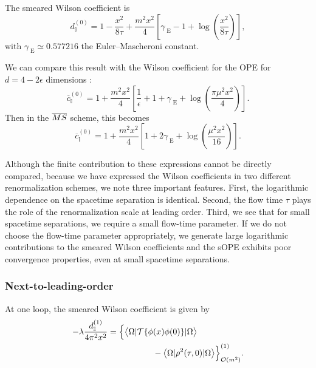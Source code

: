 The smeared Wilson 
coefficient is
\begin{equation}\label{eq:d1lead}
d_{\mathbb{I}}^{(0)} = 1 -
\frac{x^2}{8\tau}  +\frac{m^2x^2}{4}\left[\gamma_{\;\mathrm{E}} -1 + 
\log\left(\frac{x^2}{8\tau}\right)\right],
\end{equation}
with $\gamma_{\;\mathrm{E}}\simeq 0.577216$ the Euler--Mascheroni constant.

We can compare this result with the Wilson coefficient 
for the OPE for $d = 4-2\epsilon$ 
dimensions \cite{Collins:1984rdg}:
\begin{equation}
\overline{c}_{\mathbb{I}}^{(0)} =  
1 + \frac{  
m^2x^2}{4} \left[\frac{1}{\epsilon} + 1 +\gamma_{\;\mathrm{E}} + 
\log\left(\frac{\pi\mu^2x^2}{4}\right)\right].
\end{equation}
Then in the $\overline{MS}$ scheme, this becomes
\begin{equation}
\overline{c}_{\mathbb{I}}^{(0)} =  
1 +\frac{  
m^2x^2}{4} \left[1 +  2\gamma_{\;\mathrm{E}} + 
\log\left(\frac{\mu^2x^2}{16}\right)\right].
\end{equation}

Although the finite contribution to these expressions cannot be directly 
compared, 
because we have expressed the Wilson coefficients in two different 
renormalization schemes, we note three important features. First, the 
logarithmic dependence on the spacetime separation is identical. Second, 
the flow time $\tau$ plays the role of the renormalization scale at leading 
order. Third, we see that for small spacetime 
separations, we require a small flow-time parameter. If we do 
not choose the flow-time parameter appropriately, we generate large logarithmic 
contributions to the smeared Wilson coefficients and the sOPE exhibits poor 
convergence properties, even at small spacetime separations.

\subsubsection{Next-to-leading-order}

At one loop, the smeared Wilson coefficient is given by
\begin{align}
-\lambda\frac{d_{\mathbb{I}}^{(1)}}{4\pi^2x^2} = {} & \Big\{\big\langle 
\Omega | 
{\cal T}\{ 
\phi(x){} \phi(0)\} | \Omega \big\rangle \nonumber\\
{} & \qquad \qquad  - \big\langle \Omega | 
\rho^2(\tau,0)  | \Omega 
\big\rangle\Big\}_{{\cal O}(m^2)}^{(1)}.
\end{align}

